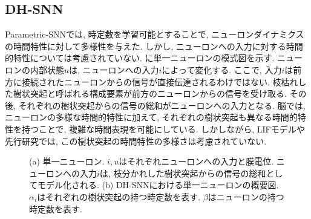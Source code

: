\subsection{DH-SNN}
Parametric-SNNでは, 時定数を学習可能とすることで, ニューロンダイナミクスの時間特性に対して多様性を与えた.
しかし, ニューロンへの入力に対する時間的特性については考慮されていない.
に単一ニューロンの模式図を示す.
ニューロンの内部状態$u$は, ニューロンへの入力$i$によって変化する.
ここで, 入力$i$は前方に接続されたニューロンからの信号が直接伝達されるわけではない.
枝枯れした樹状突起と呼ばれる構成要素が前方のニューロンからの信号を受け取る.
その後, それぞれの樹状突起からの信号の総和がニューロンへの入力となる.
脳では, ニューロンの多様な時間的特性に加えて, それぞれの樹状突起も異なる時間的特性を持つことで, 複雑な時間表現を可能にしている.
しかしながら, LIFモデルや先行研究では, この樹状突起の時間特性の多様さは考慮されていない.
\begin{figure}
    \centering

    \parbox{1.0\textwidth}{
        \centering

        \begin{minipage}{0.42325\textwidth}
            
            \label{fig:single:neuron}
        \end{minipage}
        \hspace{0.02\textwidth}
        \begin{minipage}{0.477\textwidth}
            
            \label{fig:dhsnn}
        \end{minipage}

        \caption[DH-SNNにおける単一ニューロンの模式図]{
            \cite{dhsnn}
            (a) 単一ニューロン. $i, u$はそれぞれニューロンへの入力と膜電位. 
            ニューロンへの入力$i$は, 枝分かれした樹状突起からの信号の総和としてモデル化される.
            (b) DH-SNNにおける単一ニューロンの概要図.
            $\alpha_i$はそれぞれの樹状突起の持つ時定数を表す.
            $\beta$はニューロンの持つ時定数を表す.
        }
    }


\end{figure}

